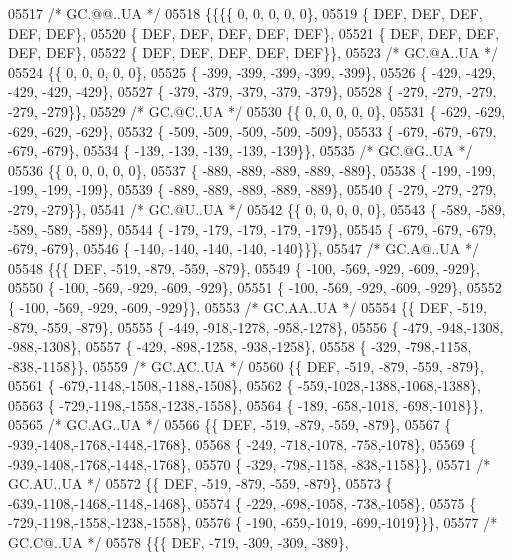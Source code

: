 \begin{DoxyCode}
05517 \textcolor{comment}{/* GC.@@..UA */}
05518 \{\{\{\{    0,    0,    0,    0,    0\},
05519 \{  DEF,  DEF,  DEF,  DEF,  DEF\},
05520 \{  DEF,  DEF,  DEF,  DEF,  DEF\},
05521 \{  DEF,  DEF,  DEF,  DEF,  DEF\},
05522 \{  DEF,  DEF,  DEF,  DEF,  DEF\}\},
05523 \textcolor{comment}{/* GC.@A..UA */}
05524 \{\{    0,    0,    0,    0,    0\},
05525 \{ -399, -399, -399, -399, -399\},
05526 \{ -429, -429, -429, -429, -429\},
05527 \{ -379, -379, -379, -379, -379\},
05528 \{ -279, -279, -279, -279, -279\}\},
05529 \textcolor{comment}{/* GC.@C..UA */}
05530 \{\{    0,    0,    0,    0,    0\},
05531 \{ -629, -629, -629, -629, -629\},
05532 \{ -509, -509, -509, -509, -509\},
05533 \{ -679, -679, -679, -679, -679\},
05534 \{ -139, -139, -139, -139, -139\}\},
05535 \textcolor{comment}{/* GC.@G..UA */}
05536 \{\{    0,    0,    0,    0,    0\},
05537 \{ -889, -889, -889, -889, -889\},
05538 \{ -199, -199, -199, -199, -199\},
05539 \{ -889, -889, -889, -889, -889\},
05540 \{ -279, -279, -279, -279, -279\}\},
05541 \textcolor{comment}{/* GC.@U..UA */}
05542 \{\{    0,    0,    0,    0,    0\},
05543 \{ -589, -589, -589, -589, -589\},
05544 \{ -179, -179, -179, -179, -179\},
05545 \{ -679, -679, -679, -679, -679\},
05546 \{ -140, -140, -140, -140, -140\}\}\},
05547 \textcolor{comment}{/* GC.A@..UA */}
05548 \{\{\{  DEF, -519, -879, -559, -879\},
05549 \{ -100, -569, -929, -609, -929\},
05550 \{ -100, -569, -929, -609, -929\},
05551 \{ -100, -569, -929, -609, -929\},
05552 \{ -100, -569, -929, -609, -929\}\},
05553 \textcolor{comment}{/* GC.AA..UA */}
05554 \{\{  DEF, -519, -879, -559, -879\},
05555 \{ -449, -918,-1278, -958,-1278\},
05556 \{ -479, -948,-1308, -988,-1308\},
05557 \{ -429, -898,-1258, -938,-1258\},
05558 \{ -329, -798,-1158, -838,-1158\}\},
05559 \textcolor{comment}{/* GC.AC..UA */}
05560 \{\{  DEF, -519, -879, -559, -879\},
05561 \{ -679,-1148,-1508,-1188,-1508\},
05562 \{ -559,-1028,-1388,-1068,-1388\},
05563 \{ -729,-1198,-1558,-1238,-1558\},
05564 \{ -189, -658,-1018, -698,-1018\}\},
05565 \textcolor{comment}{/* GC.AG..UA */}
05566 \{\{  DEF, -519, -879, -559, -879\},
05567 \{ -939,-1408,-1768,-1448,-1768\},
05568 \{ -249, -718,-1078, -758,-1078\},
05569 \{ -939,-1408,-1768,-1448,-1768\},
05570 \{ -329, -798,-1158, -838,-1158\}\},
05571 \textcolor{comment}{/* GC.AU..UA */}
05572 \{\{  DEF, -519, -879, -559, -879\},
05573 \{ -639,-1108,-1468,-1148,-1468\},
05574 \{ -229, -698,-1058, -738,-1058\},
05575 \{ -729,-1198,-1558,-1238,-1558\},
05576 \{ -190, -659,-1019, -699,-1019\}\}\},
05577 \textcolor{comment}{/* GC.C@..UA */}
05578 \{\{\{  DEF, -719, -309, -309, -389\},

\end{DoxyCode}
